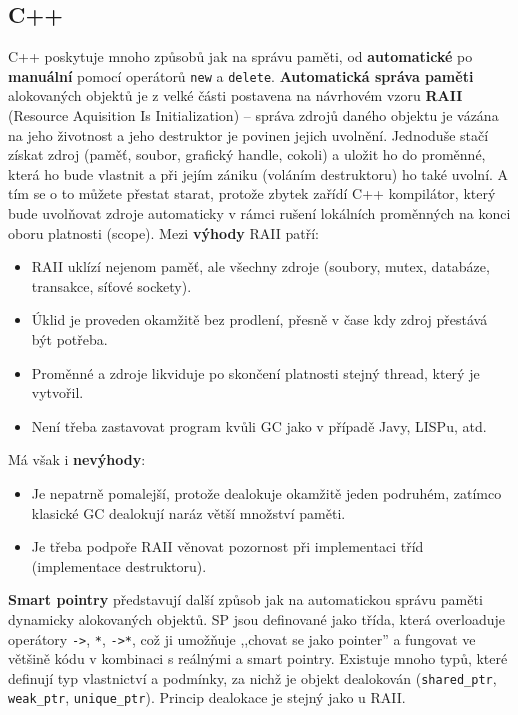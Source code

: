 \subsection{C++}
C++ poskytuje mnoho způsobů jak na správu paměti, od \textbf{automatické} po \textbf{manuální} pomocí operátorů \texttt{new} a \texttt{delete}. \textbf{Automatická správa paměti} alokovaných objektů je z velké části postavena na návrhovém vzoru \textbf{RAII} (Resource Aquisition Is Initialization) -- správa zdrojů daného objektu je vázána na jeho životnost a jeho destruktor je povinen jejich uvolnění. Jednoduše stačí získat zdroj (paměť, soubor, grafický handle, cokoli) a uložit ho do proměnné, která ho bude vlastnit a při jejím zániku (voláním destruktoru) ho také uvolní. A tím se o to můžete přestat starat, protože zbytek zařídí C++ kompilátor, který bude uvolňovat zdroje automaticky v rámci rušení lokálních proměnných na konci oboru platnosti (scope). Mezi \textbf{výhody} RAII patří:
\begin{itemize}
    \item RAII uklízí nejenom paměť, ale všechny zdroje (soubory, mutex, databáze, transakce, síťové sockety).
    \item Úklid je proveden okamžitě bez prodlení, přesně v čase kdy zdroj přestává být potřeba.
    \item Proměnné a zdroje likviduje po skončení platnosti stejný thread, který je vytvořil.
    \item Není třeba zastavovat program kvůli GC jako v případě Javy, LISPu, atd.
\end{itemize}
Má však i \textbf{nevýhody}:
\begin{itemize}
    \item Je nepatrně pomalejší, protože dealokuje okamžitě jeden podruhém, zatímco klasické GC dealokují naráz větší množství paměti.
    \item Je třeba podpoře RAII věnovat pozornost při implementaci tříd (implementace destruktoru).
\end{itemize}

\textbf{Smart pointry} představují další způsob jak na automatickou správu paměti dynamicky alokovaných objektů. SP jsou definované jako třída, která overloaduje operátory \texttt{->}, \texttt{*}, \texttt{->*}, což ji umožňuje ,,chovat se jako pointer'' a fungovat ve většině kódu v kombinaci s reálnými a smart pointry. Existuje mnoho typů, které definují typ vlastnictví a podmínky, za nichž je objekt dealokován (\texttt{shared\_ptr}, \texttt{weak\_ptr}, \texttt{unique\_ptr}). Princip dealokace je stejný jako u RAII.

